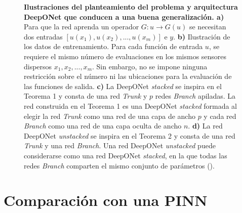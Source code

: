 \documentclass[
  spanish,
  us-letterpaper,
  DIV=11,
  numbers=noendperiod]{scrreprt}
\begin{document}
\begin{figure}


\caption{\label{fig-deeponet-arch}\textbf{Ilustraciones del
planteamiento del problema y arquitectura DeepONet que conducen a una
buena generalización. a)} Para que la red aprenda un operador
\(G : u \rightarrow G(u)\) se necesitan dos entradas
\([u(x_1), u(x_2), ..., u(x_m)]\) e \(y\). \textbf{b)} Ilustración de
los datos de entrenamiento. Para cada función de entrada \(u\), se
requiere el mismo número de evaluaciones en los mismos sensores
dispersos \(x_1, x_2, ..., x_m\). Sin embargo, no se impone ninguna
restricción sobre el número ni las ubicaciones para la evaluación de las
funciones de salida. \textbf{c)} La DeepONet \emph{stacked} se inspira
en el Teorema 1 y consta de una red \emph{Trunk} y \(p\) redes
\emph{Branch} apiladas. La red construida en el Teorema 1 es una
DeepONet \emph{stacked} formada al elegir la red \emph{Trunk} como una
red de una capa de ancho \(p\) y cada red \emph{Branch} como una red de
una capa oculta de ancho \(n\). \textbf{d)} La red DeepONet
\emph{unstacked} se inspira en el Teorema 2 y consta de una red
\emph{Trunk} y una red \emph{Branch}. Una red DeepONet \emph{unstacked}
puede considerarse como una red DeepONet \emph{stacked}, en la que todas
las redes \emph{Branch} comparten el mismo conjunto de parámetros
().}

\end{figure}%

\section{Comparación con una PINN}\label{comparaciuxf3n-con-una-pinn}
\end{document}
